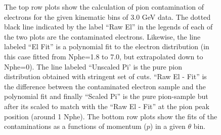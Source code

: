 \begin{figure}[ht]
\centering
{}
\quad
{}
\quad
{}

\caption[Calculation of pion contamination and fits.]{The top row plots show the calculation of pion contamination of electrons for the given kinematic bins of 3.0 GeV data. The dotted black line indicated by the label ``Raw El'' in the legends of each of the two plots are the contaminated electrons. Likewise, the line labeled ``El Fit'' is a polynomial fit to the electron distribution (in this case fitted from Nphe=1.8 to 7.0, but extrapolated down to Nphe=0). The line labeled ``Unscaled Pi' is the pure pion distribution obtained with stringent set of cuts. ``Raw El - Fit'' is the difference between the contaminated electron sample and the polynomial fit and finally ``Scaled Pi'' is the pure pion-sample but after its scaled to match with the ``Raw El - Fit'' at the pion peak position (around 1 Nphe). The bottom row plots show the fits of the contaminations as a functions of momentum ($p$) in a given $\theta$ bin. }
\label{figpiCont}

\end{figure}







